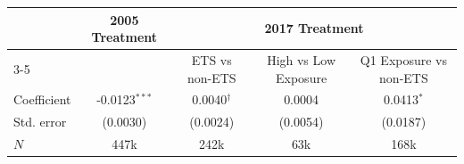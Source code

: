 \begin{tabular}{lcccc}
\toprule
 & 2005 Treatment & \multicolumn{3}{c}{2017 Treatment} \\
\cmidrule(lr){3-5}
 &  & ETS vs non-ETS & High vs Low Exposure & Q1 Exposure vs non-ETS \\
\midrule
Coefficient & -0.0123$^{***}$ & 0.0040$^{\dagger}$ & 0.0004 & 0.0413$^{*}$ \\
Std. error & (0.0030) & (0.0024) & (0.0054) & (0.0187) \\
$N$ & 447k & 242k & 63k & 168k \\
\bottomrule
\end{tabular}
